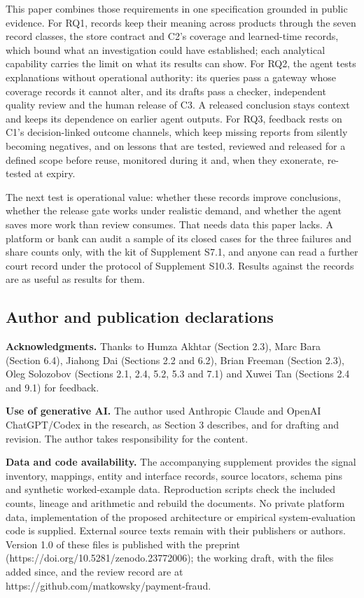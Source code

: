 \documentclass[
  11pt,
]{article}
\begin{document}
This paper combines those requirements in one specification grounded in
public evidence. For RQ1, records keep their meaning across products
through the seven record classes, the store contract and C2's coverage
and learned-time records, which bound what an investigation could have
established; each analytical capability carries the limit on what its
results can show. For RQ2, the agent tests explanations without
operational authority: its queries pass a gateway whose coverage records
it cannot alter, and its drafts pass a checker, independent quality
review and the human release of C3. A released conclusion stays context
and keeps its dependence on earlier agent outputs. For RQ3, feedback
rests on C1's decision-linked outcome channels, which keep missing
reports from silently becoming negatives, and on lessons that are
tested, reviewed and released for a defined scope before reuse,
monitored during it and, when they exonerate, re-tested at expiry.

The next test is operational value: whether these records improve
conclusions, whether the release gate works under realistic demand, and
whether the agent saves more work than review consumes. That needs data
this paper lacks. A platform or bank can audit a sample of its closed
cases for the three failures and share counts only, with the kit of
Supplement S7.1, and anyone can read a further court record under the
protocol of Supplement S10.3. Results against the records are as useful
as results for them.

\FloatBarrier

\hypertarget{author-and-publication-declarations}{%
\subsection{Author and publication
declarations}\label{author-and-publication-declarations}}

\suppressfloats[t]

\textbf{Acknowledgments.} Thanks to Humza Akhtar (Section 2.3), Marc
Bara (Section 6.4), Jiahong Dai (Sections 2.2 and 6.2), Brian Freeman
(Section 2.3), Oleg Solozobov (Sections 2.1, 2.4, 5.2, 5.3 and 7.1) and
Xuwei Tan (Sections 2.4 and 9.1) for feedback.

\textbf{Use of generative AI.} The author used Anthropic Claude and
OpenAI ChatGPT/Codex in the research, as Section 3 describes, and for
drafting and revision. The author takes responsibility for the content.

\textbf{Data and code availability.} The accompanying supplement
provides the signal inventory, mappings, entity and interface records,
source locators, schema pins and synthetic worked-example data.
Reproduction scripts check the included counts, lineage and arithmetic
and rebuild the documents. No private platform data, implementation of
the proposed architecture or empirical system-evaluation code is
supplied. External source texts remain with their publishers or authors.
Version 1.0 of these files is published with the preprint
(https://doi.org/10.5281/zenodo.23772006); the working draft, with the
files added since, and the review record are at
https://github.com/matkowsky/payment-fraud.
\end{document}
